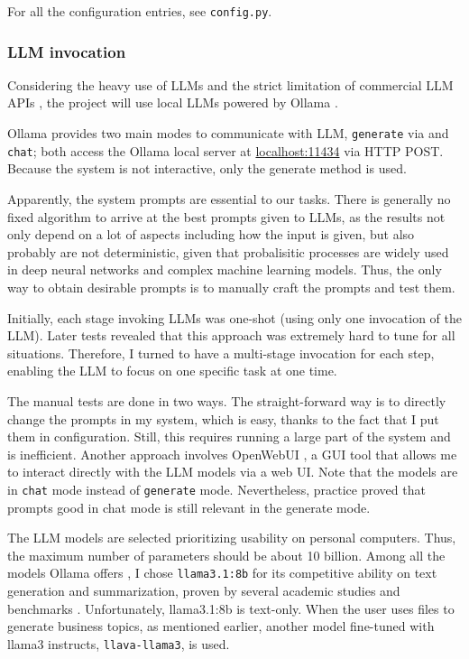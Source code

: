 \documentclass[final-report]{report-template}
\begin{document}
For all the configuration entries, see \texttt{config.py}.

\subsubsection{LLM invocation}
Considering the heavy use of LLMs and the strict limitation of commercial LLM
APIs \cite{openai.api.limit, anthropic.api.limit}, the project will use local
LLMs powered by Ollama \cite{ollama}.

Ollama provides two main modes to communicate with LLM, \texttt{generate} via
and \texttt{chat}; both access the Ollama local server at
\url{localhost:11434} via HTTP POST. Because the system is not interactive,
only the generate method is used.

Apparently, the system prompts are essential to our tasks. There is
generally no fixed algorithm to arrive at the best prompts given to LLMs, as
the results not only depend on a lot of aspects including how the input is
given, but also probably are not deterministic, given that probalisitic
processes are widely used in deep neural networks and complex machine learning
models. Thus, the only way to obtain desirable prompts is to manually craft the
prompts and test them.

Initially, each stage invoking LLMs was one-shot (using only one invocation of
the LLM). Later tests revealed that this approach was extremely hard to tune
for all situations. Therefore, I turned to have a multi-stage invocation for
each step, enabling the LLM to focus on one specific task at one time.

The manual tests are done in two ways. The straight-forward way is to directly
change the prompts in my system, which is easy, thanks to the fact that I
put them in configuration. Still, this requires running a large part of the
system and is inefficient. Another approach involves OpenWebUI
\cite{open.webui}, a GUI tool that allows me to interact directly with the LLM
models via a web UI. Note that the models are in \texttt{chat} mode instead of
\texttt{generate} mode. Nevertheless, practice proved that prompts good in chat
mode is still relevant in the generate mode.

The LLM models are selected prioritizing usability on personal computers. Thus,
the maximum number of parameters should be about 10 billion. Among all the
models Ollama offers \cite{ollama.models}, I chose \texttt{llama3.1:8b} for its
competitive ability on text generation and summarization, proven by several
academic studies and benchmarks
\cite{llama3.1.bench.1, llama3.1.bench.2, llama3.1.bench.3}. Unfortunately,
llama3.1:8b is text-only. When the user uses files to generate business topics,
as mentioned earlier, another model fine-tuned with llama3 instructs,
\texttt{llava-llama3}, is used.
\end{document}
